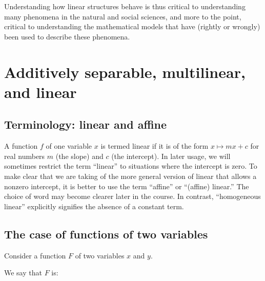 \documentclass[10pt]{amsart}
\begin{document}
Understanding how linear structures behave is thus critical to
understanding many phenomena in the natural and social sciences, and
more to the point, critical to understanding the mathematical models
that have (rightly or wrongly) been used to describe these phenomena.

\section{Additively separable, multilinear, and linear}

\subsection{Terminology: linear and affine}

A function $f$ of one variable $x$ is termed linear if it is of the
form $x \mapsto mx + c$ for real numbers $m$ (the slope) and $c$ (the
intercept). In later usage, we will sometimes restrict the term
``linear'' to situations where the intercept is zero. To make clear
that we are taking of the more general version of linear that allows a
nonzero intercept, it is better to use the term ``affine'' or
``(affine) linear.'' The choice of word may become clearer later in
the course. In contrast, ``homogeneous linear'' explicitly signifies
the absence of a constant term.

\subsection{The case of functions of two variables}

Consider a function $F$ of two variables $x$ and $y$.

We say that $F$ is:
\end{document}
